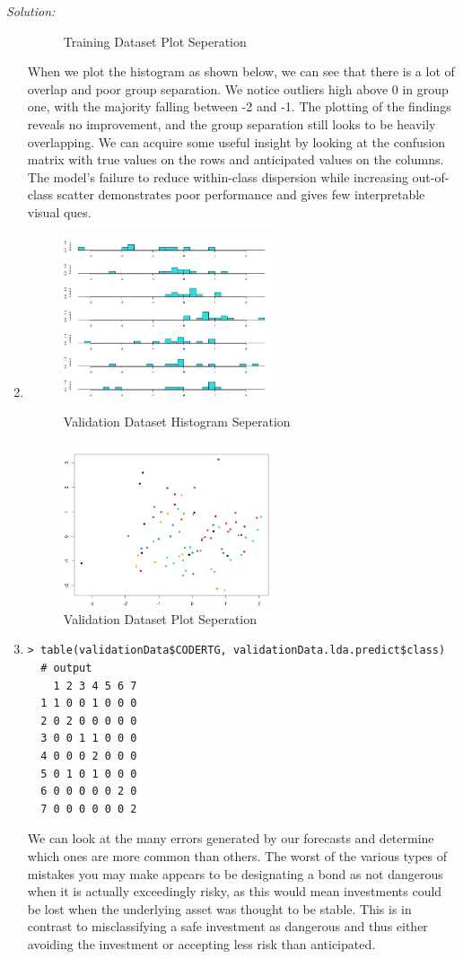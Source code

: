 \documentclass{article}
\newenvironment{solution}
    {\textit{Solution:}}
    {}
\begin{document}
\begin{solution}
\begin{enumerate}
\begin{figure}[h]
		\caption{Training Dataset Plot Seperation}
	\end{figure}
When we plot the histogram as shown below, we can see that there is a lot of overlap and poor group separation. We notice outliers high above 0 in group one, with the majority falling between -2 and -1. The plotting of the findings reveals no improvement, and the group separation still looks to be heavily overlapping. We can acquire some useful insight by looking at the confusion matrix with true values on the rows and anticipated values on the columns. The model's failure to reduce within-class dispersion while increasing out-of-class scatter demonstrates poor performance and gives few interpretable visual ques.
\newpage
\item\mbox{}
	\begin{figure}[h]
		\centering
		\includegraphics[width=0.6\textwidth]{Figure4_b_1.jpeg}
		\caption{Validation Dataset Histogram Seperation}
		\includegraphics[width=0.6\textwidth]{Figure4_b_2.jpeg}
		\caption{Validation Dataset Plot Seperation}
	\end{figure}
\newpage
\item\mbox{}
	\begin{lstlisting}
> table(validationData$CODERTG, validationData.lda.predict$class)
  # output
    1 2 3 4 5 6 7
  1 1 0 0 1 0 0 0
  2 0 2 0 0 0 0 0
  3 0 0 1 1 0 0 0
  4 0 0 0 2 0 0 0
  5 0 1 0 1 0 0 0
  6 0 0 0 0 0 2 0
  7 0 0 0 0 0 0 2
	\end{lstlisting}
We can look at the many errors generated by our forecasts and determine which ones are more common than others. The worst of the various types of mistakes you may make appears to be designating a bond as not dangerous when it is actually exceedingly risky, as this would mean investments could be lost when the underlying asset was thought to be stable. This is in contrast to misclassifying a safe investment as dangerous and thus either avoiding the investment or accepting less risk than anticipated.
\end{enumerate}
\end{solution}
\end{document}
